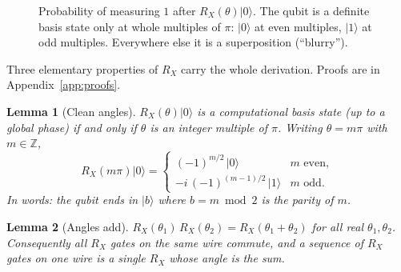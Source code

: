 \documentclass[11pt,a4paper]{article}
\newcommand{\ket}[1]{\lvert #1 \rangle}
\newcommand{\RX}{R_X}
\newcommand{\Z}{\mathbb{Z}}
\theoremstyle{plain}
\newtheorem{lemma}{Lemma}[section]
\theoremstyle{definition}
\theoremstyle{remark}
\begin{document}
\begin{figure}[ht]
\centering
{}
\caption{Probability of measuring $1$ after $\RX(\theta)\ket{0}$. The qubit is a definite basis
state only at whole multiples of $\pi$: $\ket{0}$ at even multiples, $\ket{1}$ at odd multiples.
Everywhere else it is a superposition (``blurry'').}
\label{fig:sin2}
\end{figure}

Three elementary properties of $\RX$ carry the whole derivation. Proofs are in
Appendix~\ref{app:proofs}.

\begin{lemma}[Clean angles]\label{lem:clean}
$\RX(\theta)\ket{0}$ is a computational basis state (up to a global phase) if and only if
$\theta$ is an integer multiple of $\pi$. Writing $\theta = m\pi$ with $m\in\Z$,
\[
\RX(m\pi)\ket{0} = \begin{cases}
 (-1)^{m/2}\,\ket{0} & m \text{ even},\\[2pt]
 -i\,(-1)^{(m-1)/2}\,\ket{1} & m \text{ odd}.
\end{cases}
\]
In words: the qubit ends in $\ket{b}$ where $b = m \bmod 2$ is the parity of $m$.
\end{lemma}

\begin{lemma}[Angles add]\label{lem:add}
$\RX(\theta_1)\,\RX(\theta_2) = \RX(\theta_1+\theta_2)$ for all real $\theta_1,\theta_2$.
Consequently all $\RX$ gates on the same wire commute, and a sequence of $\RX$ gates on one wire
is a single $\RX$ whose angle is the sum.
\end{lemma}
\end{document}
